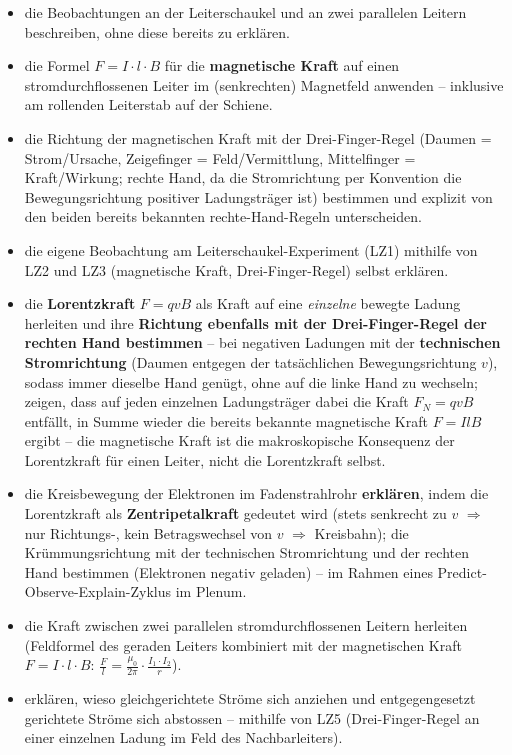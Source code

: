 \documentclass[11pt,a4paper]{article}
\begin{document}
\begin{itemize}[leftmargin=1.3cm,itemsep=0.3em]
  \item[LZ1] die Beobachtungen an der Leiterschaukel und an zwei
  parallelen Leitern beschreiben, ohne diese bereits zu erklären.
  \item[LZ2] die Formel $F=I\cdot l\cdot B$ für die \textbf{magnetische
  Kraft} auf einen stromdurchflossenen Leiter im (senkrechten) Magnetfeld
  anwenden -- inklusive am rollenden Leiterstab auf der Schiene.
  \item[LZ3] die Richtung der magnetischen Kraft mit der Drei-Finger-Regel
  (Daumen = Strom/Ursache, Zeigefinger = Feld/Vermittlung,
  Mittelfinger = Kraft/Wirkung; rechte Hand, da die Stromrichtung per
  Konvention die Bewegungsrichtung positiver Ladungsträger ist) bestimmen
  und explizit von den beiden bereits bekannten rechte-Hand-Regeln
  unterscheiden.
  \item[LZ4] die eigene Beobachtung am Leiterschaukel-Experiment (LZ1)
  mithilfe von LZ2 und LZ3 (magnetische Kraft, Drei-Finger-Regel) selbst erklären.
  \item[LZ5] die \textbf{Lorentzkraft} $F=qvB$ als Kraft auf eine
  \emph{einzelne} bewegte Ladung herleiten und ihre \textbf{Richtung
  ebenfalls mit der Drei-Finger-Regel der rechten Hand bestimmen} -- bei
  negativen Ladungen mit der \textbf{technischen Stromrichtung} (Daumen
  entgegen der tatsächlichen Bewegungsrichtung $v$), sodass immer dieselbe
  Hand genügt, ohne auf die linke Hand zu wechseln; zeigen, dass auf jeden
  einzelnen Ladungsträger dabei die Kraft $F_N=qvB$ entfällt, in Summe
  wieder die bereits bekannte magnetische Kraft $F=IlB$ ergibt -- die
  magnetische Kraft ist die makroskopische Konsequenz der Lorentzkraft
  für einen Leiter, nicht die Lorentzkraft selbst.
  \item[LZ6] die Kreisbewegung der Elektronen im Fadenstrahlrohr
  \textbf{erklären}, indem die Lorentzkraft als \textbf{Zentripetalkraft}
  gedeutet wird (stets senkrecht zu $v$ $\Rightarrow$ nur Richtungs-, kein
  Betragswechsel von $v$ $\Rightarrow$ Kreisbahn); die Krümmungsrichtung
  mit der technischen Stromrichtung und der rechten Hand bestimmen
  (Elektronen negativ geladen) -- im Rahmen eines
  Predict-Observe-Explain-Zyklus im Plenum.
  \item[LZ7] die Kraft zwischen zwei parallelen stromdurchflossenen
  Leitern herleiten (Feldformel des geraden Leiters kombiniert mit der
  magnetischen Kraft $F=I\cdot l\cdot B$: $\frac{F}{l}=\frac{\mu_0}{2\pi}
  \cdot\frac{I_1\cdot I_2}{r}$).
  \item[LZ8] erklären, wieso gleichgerichtete Ströme sich anziehen und
  entgegengesetzt gerichtete Ströme sich abstossen -- mithilfe von LZ5
  (Drei-Finger-Regel an einer einzelnen Ladung im Feld des Nachbarleiters).
\end{itemize}
\end{document}
